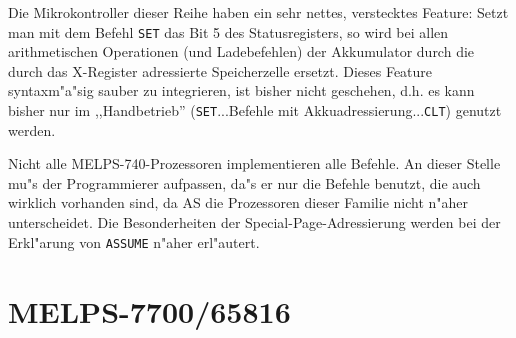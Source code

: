 \documentclass[12pt,a4paper,twoside]{report}
\newcommand{\tty}[1]{{\tt #1}}
\begin{document}
{Die Mikrokontroller dieser Reihe haben ein sehr nettes, verstecktes
Feature: Setzt man mit dem Befehl \tty{SET} das Bit 5 des
Statusregisters, so wird bei allen arithmetischen Operationen (und
Ladebefehlen) der Akkumulator durch die durch das X-Register adressierte
Speicherzelle ersetzt.  Dieses Feature syntaxm"a"sig sauber zu integrieren,
ist bisher nicht geschehen, d.h. es kann bisher nur im ,,Handbetrieb''
(\tty{SET}...Befehle mit Akkuadressierung...\tty{CLT}) genutzt werden.
\par
Nicht alle MELPS-740-Prozessoren implementieren alle Befehle.  An dieser
Stelle mu"s der Programmierer aufpassen, da"s er nur die Befehle benutzt,
die auch wirklich vorhanden sind, da AS die Prozessoren dieser Familie
nicht n"aher unterscheidet.  Die Besonderheiten der
Special-Page-Adressierung werden bei der Erkl"arung von \tty{ASSUME} n"aher
erl"autert.


\section{MELPS-7700/65816}
\label{MELPS7700Spec}

}
\end{document}
